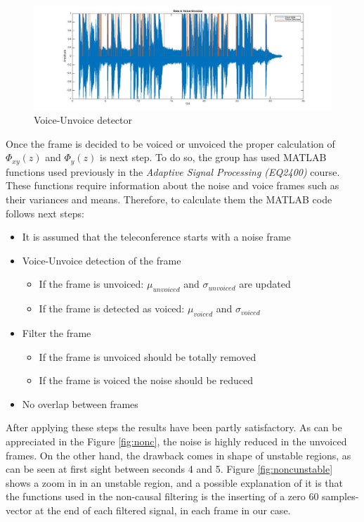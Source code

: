 \documentclass[11pt,a4paper,english]{book}  %
\theoremstyle{definition}  %
\theoremstyle{plain}  %
\theoremstyle{remark}  %
\begin{document}
		\begin{figure}[h]
		\centering
		\includegraphics[width=15cm]{images/theory/highsigma.jpg}
		\caption{Voice-Unvoice detector}
		\label{fig:detector}
		\end{figure}
		
		
		Once the frame is decided to be voiced or unvoiced the proper calculation of $\Phi_{xy}(z)$ and $\Phi_{y}(z)$ is next step. To do so, the group has used MATLAB functions used previously in the \textit{Adaptive Signal Processing (EQ2400)} course. These functions require information about the noise and voice frames such as their variances and means. Therefore, to calculate them the MATLAB code follows next steps:
		
		\begin{itemize}
		\item It is assumed that the teleconference starts with a noise frame
			\item Voice-Unvoice detection of the frame
		\begin{itemize}
			\item If the frame is unvoiced: $\mu_{unvoiced}$ and $\sigma_{unvoiced}$ are updated
			\item If the frame is detected as voiced: $\mu_{voiced}$ and $\sigma_{voiced}$
			\end{itemize}
			
		\item Filter the frame
			\begin{itemize}
			\item If the frame is unvoiced should be totally removed
			\item If the frame is voiced the noise should be reduced
			\end{itemize}
			\item No overlap between frames
		\end{itemize}
		
		After applying these steps the results have been partly satisfactory. As can be appreciated in the Figure \ref{fig:nonc}, the noise is highly reduced in the unvoiced frames. On the other hand, the drawback comes in shape of unstable regions, as can be seen at first sight between seconds 4 and 5. Figure \ref{fig:noncunstable} shows a zoom in in an unstable region, and a possible explanation of it is that the functions used in the non-causal filtering is the inserting of a zero 60 samples-vector at the end of each filtered signal, in each frame in our case.
		
\end{document}
